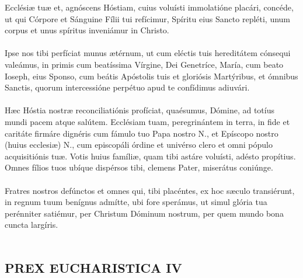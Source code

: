 \documentclass[12pt, a4paper]{article}
\begin{document}
	Ecclésiæ tuæ et, agnóscens
	Hóstiam, cuius voluísti
	immolatióne placári, concéde, ut
	qui Córpore et Sánguine Fílii tui
	refícimur, Spíritu eius Sancto
	repléti, unum corpus et unus
	spíritus inveniámur in Christo.
	\\\\
	Ipse nos tibi perfíciat munus
	ætérnum, ut cum eléctis tuis
	hereditátem cónsequi valeámus,
	in primis cum beatíssima Vírgine,
	Dei Genetríce, María, cum beato
	Ioseph, eius Sponso, cum beátis
	Apóstolis tuis et gloriósis
	Martýribus, et ómnibus Sanctis,
	quorum intercessióne perpétuo
	apud te confídimus adiuvári.
	\\\\
	Hæc Hóstia nostræ reconciliatiónis
	profíciat, quaésumus, Dómine, ad totíus mundi pacem atque salútem.
	Ecclésiam tuam, peregrinántem in
	terra, in fide et caritáte firmáre
	dignéris cum fámulo tuo Papa
	nostro N., et Epíscopo nostro
	(huius ecclesiæ) N., cum episcopáli
	órdine et univérso clero et omni
	pópulo acquisitiónis tuæ. Votis
	huius famíliæ, quam tibi astáre
	voluísti, adésto propítius.
	Omnes fílios tuos ubíque dispérsos
	tibi, clemens Pater, miserátus
	coniúnge.
	\\\\
	Fratres nostros defúnctos et omnes
	qui, tibi placéntes, ex hoc sæculo
	transiérunt, in regnum tuum
	benígnus admítte, ubi fore
	sperámus, ut simul glória tua
	perénniter satiémur, per Christum
	Dóminum nostrum, per quem
	mundo bona cuncta largíris.
	\\\\
	
	\newpage
	
	\subsection*{PREX EUCHARISTICA IV}
	
\end{document}
